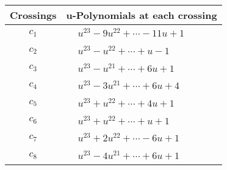 \documentclass[1p]{elsarticle_modified}
\theoremstyle{definition}
\begin{document}
\begin{tabular}{m{50pt}|m{274pt}}
Crossings & \hspace{64pt}u-Polynomials at each crossing \\
\hline $$\begin{aligned}c_{1}\end{aligned}$$&$\begin{aligned}
&u^{23}-9 u^{22}+\cdots-11 u+1
\end{aligned}$\\
\hline $$\begin{aligned}c_{2}\end{aligned}$$&$\begin{aligned}
&u^{23}- u^{22}+\cdots+u-1
\end{aligned}$\\
\hline $$\begin{aligned}c_{3}\end{aligned}$$&$\begin{aligned}
&u^{23}- u^{21}+\cdots+6 u+1
\end{aligned}$\\
\hline $$\begin{aligned}c_{4}\end{aligned}$$&$\begin{aligned}
&u^{23}-3 u^{21}+\cdots+6 u+4
\end{aligned}$\\
\hline $$\begin{aligned}c_{5}\end{aligned}$$&$\begin{aligned}
&u^{23}+u^{22}+\cdots+4 u+1
\end{aligned}$\\
\hline $$\begin{aligned}c_{6}\end{aligned}$$&$\begin{aligned}
&u^{23}+u^{22}+\cdots+u+1
\end{aligned}$\\
\hline $$\begin{aligned}c_{7}\end{aligned}$$&$\begin{aligned}
&u^{23}+2 u^{22}+\cdots-6 u+1
\end{aligned}$\\
\hline $$\begin{aligned}c_{8}\end{aligned}$$&$\begin{aligned}
&u^{23}-4 u^{21}+\cdots+6 u+1
\end{aligned}$\\

\end{tabular}
\end{document}

